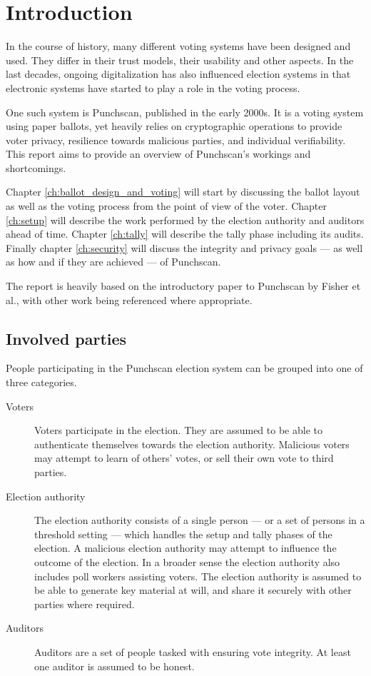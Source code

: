 \chapter{Introduction}
\label{chapter:introduction}

In the course of history, many different voting systems have been designed and
used. They differ in their trust models, their usability and other aspects. In
the last decades, ongoing digitalization has also influenced election systems
in that electronic systems have started to play a role in the voting process.

One such system is Punchscan, published in the early 2000s. It is a voting
system using paper ballots, yet heavily relies on cryptographic operations to
provide voter privacy, resilience towards malicious parties, and individual
verifiability. This report aims to provide an overview of Punchscan's
workings and shortcomings.

Chapter \ref{ch:ballot_design_and_voting} will start by discussing the ballot
layout as well as the voting process from the point of view of the voter.
Chapter \ref{ch:setup} will describe the work performed by the election
authority and auditors ahead of time. Chapter \ref{ch:tally} will describe the
tally phase including its audits. Finally chapter \ref{ch:security} will
discuss the integrity and privacy goals --- as well as how and if they are
achieved --- of Punchscan. 

The report is heavily based on the introductory paper to Punchscan by Fisher et
al.\autocite{fisherPunchscanIntroductionSystem2006}, with other work being
referenced where appropriate.

\section{Involved parties}

People participating in the Punchscan election system can be grouped into one
of three categories.
\begin{description}
\item[Voters] Voters participate in the election. They are assumed to be able
to authenticate themselves towards the election authority. Malicious voters may
attempt to learn of others' votes, or sell their own vote to third parties.
\item[Election authority] The election authority consists of a single person
--- or a set of persons in a threshold setting --- which handles the setup and
tally phases of the election. A malicious election authority may attempt to
influence the outcome of the election. In a broader sense the election
authority also includes poll workers assisting voters. The election authority
is assumed to be able to generate key material at will, and share it
securely with other parties where required.
\item[Auditors] Auditors are a set of people tasked with ensuring vote
integrity. At least one auditor is assumed to be honest.
\end{description}


